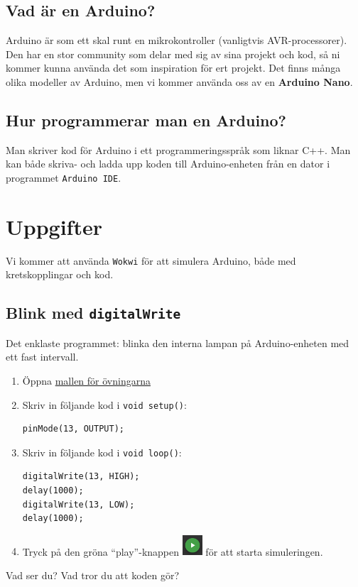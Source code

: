 \documentclass[11pt]{article}
\newcommand{\mallurl}{https://wokwi.com/projects/357812594927244289}
\begin{document}
\subsection{Vad är en Arduino?}
Arduino är som ett skal runt en mikrokontroller (vanligtvis AVR-processorer).
Den har en stor community som delar med sig av sina projekt och kod, så ni
kommer kunna använda det som inspiration för ert projekt. Det finns många olika
modeller av Arduino, men vi kommer använda oss av en \textbf{Arduino Nano}.

\subsection{Hur programmerar man en Arduino?}
Man skriver kod för Arduino i ett programmeringsspråk som liknar C++. Man kan
både skriva- och ladda upp koden till Arduino-enheten från en dator i
programmet \texttt{Arduino IDE}.

\newpage
\onehalfspacing
\section{Uppgifter}
Vi kommer att använda \texttt{Wokwi} för att simulera Arduino, både med
kretskopplingar och kod.
\subsection{Blink med \texttt{digitalWrite}}\label{sec:blink}
Det enklaste programmet: blinka den interna lampan på Arduino-enheten med ett
fast intervall.

\begin{enumerate}[itemsep=1em]
      \item
            Öppna \href{\mallurl}{mallen för övningarna}
      \item
            Skriv in följande kod i \texttt{void setup()}:

            \begin{lstlisting}
pinMode(13, OUTPUT);
       \end{lstlisting}
      \item
            Skriv in följande kod i \texttt{void loop()}:

            \begin{lstlisting}
digitalWrite(13, HIGH);
delay(1000);
digitalWrite(13, LOW);
delay(1000);
       \end{lstlisting}
      \item
            Tryck på den gröna ``play''-knappen
            \includegraphics[width=2em,valign=c]{play} för att starta
            simuleringen.
\end{enumerate}
\vspace{1em}
Vad ser du? Vad tror du att koden gör?
\end{document}

